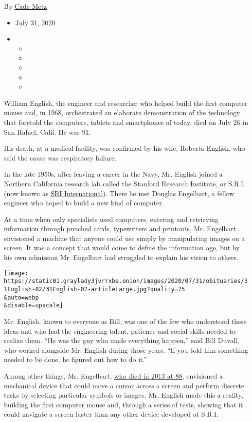 By \href{https://www.nytimes3xbfgragh.onion/by/cade-metz}{Cade Metz}

\begin{itemize}
\item
  July 31, 2020
\item
  \begin{itemize}
  \item
  \item
  \item
  \item
  \item
  \end{itemize}
\end{itemize}

William English, the engineer and researcher who helped build the first
computer mouse and, in 1968, orchestrated an elaborate demonstration of
the technology that foretold the computers, tablets and smartphones of
today, died on July 26 in San Rafael, Calif. He was 91.

His death, at a medical facility, was confirmed by his wife, Roberta
English, who said the cause was respiratory failure.

In the late 1950s, after leaving a career in the Navy, Mr. English
joined a Northern California research lab called the Stanford Research
Institute, or S.R.I. (now known as \href{https://www.sri.com/}{SRI
International}). There he met Douglas Engelbart, a fellow engineer who
hoped to build a new kind of computer.

At a time when only specialists used computers, entering and retrieving
information through punched cards, typewriters and printouts, Mr.
Engelbart envisioned a machine that anyone could use simply by
manipulating images on a screen. It was a concept that would come to
define the information age, but by his own admission Mr. Engelbart had
struggled to explain his vision to others.

\texttt{[image: https://static01.graylady3jvrrxbe.onion/images/2020/07/31/obituaries/31English-02/31English-02-articleLarge.jpg?quality=75\\\&auto=webp\\\&disable=upscale]}

Mr. English, known to everyone as Bill, was one of the few who
understood these ideas and who had the engineering talent, patience and
social skills needed to realize them. ``He was the guy who made
everything happen,'' said Bill Duvall, who worked alongside Mr. English
during those years. ``If you told him something needed to be done, he
figured out how to do it.''

Among other things, Mr. Engelbart,
\href{https://www.nytimes3xbfgragh.onion/2013/07/04/technology/douglas-c-engelbart-inventor-of-the-computer-mouse-dies-at-88.html\#:~:text=Engelbart\%20died\%20on\%20Tuesday\%20at,the\%20cause\%20was\%20kidney\%20failure.}{who
died in 2013 at 88}, envisioned a mechanical device that could move a
cursor across a screen and perform discrete tasks by selecting
particular symbols or images. Mr. English made this a reality, building
the first computer mouse and, through a series of tests, showing that it
could navigate a screen faster than any other device developed at S.R.I.

